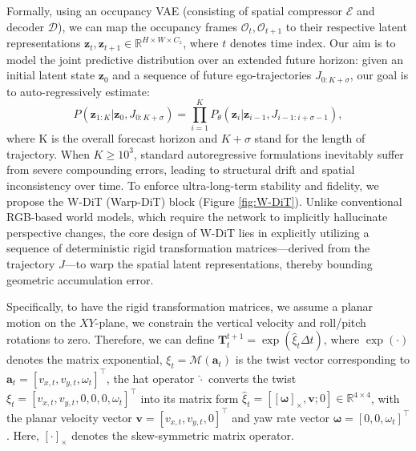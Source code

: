 Formally, using an occupancy VAE  \cite{liu2025towards} (consisting of spatial compressor $\mathcal{E}$ and decoder $\mathcal{D}$), we can map the occupancy frames $\mathcal{O}_t, \mathcal{O}_{t+1}$ to their respective latent representations $\mathbf{z}_t, \mathbf{z}_{t+1} \in \mathbb{R}^{H \times W \times C_z}$, where $t$ denotes time index. Our aim is to model the joint predictive distribution over an extended future horizon: given an initial latent state $\mathbf{z}_0$ and a sequence of future ego-trajectories $J_{0:K+\sigma}$, our goal is to auto-regressively estimate:
\vspace{-2mm}
\begin{equation}
    P(\mathbf{z}_{1:K} | \mathbf{z}_0, J_{0:K+\sigma}) = \prod_{i=1}^{K} P_{\theta}(\mathbf{z}_{i} | \mathbf{z}_{i-1}, J_{i-1:i+\sigma-1}),
\end{equation}%
where K is the overall forecast horizon and $K + \sigma$ stand for the length of trajectory. When $K \geq 10^{3}$, standard autoregressive formulations inevitably suffer from severe compounding errors, leading to structural drift and spatial inconsistency over time. To enforce ultra-long-term stability and fidelity, we propose the W-DiT (Warp-DiT) block (Figure \ref{fig:W-DiT}). Unlike conventional RGB-based world models, which require the network to implicitly hallucinate perspective changes, the core design of W-DiT lies in explicitly utilizing a sequence of deterministic rigid transformation matrices—derived from the trajectory $J$—to warp the spatial latent representations, thereby bounding geometric accumulation error.
 

Specifically, to have the rigid transformation matrices, we assume a planar motion on the $XY$-plane, we constrain the vertical velocity and roll/pitch rotations to zero. Therefore, we can define $\mathbf{T}_{t}^{t+1} = \exp(\widehat{\xi}_t \Delta t)$, where $\exp(\cdot)$ denotes the matrix exponential, $\xi_t = \mathcal{M}(\boldsymbol{a}_t)$ is the twist vector corresponding to $\boldsymbol{a}_t = [v_{x,t}, v_{y,t}, \omega_t]^\top$, the hat operator $\widehat{\cdot}$ converts the twist $\xi_t = [v_{x,t}, v_{y,t}, 0, 0, 0, \omega_t]^\top$ into its matrix form $\widehat{\xi}_t = [ [\boldsymbol{\omega}]_\times, \mathbf{v}; 0 ] \in \mathbb{R}^{4\times4}$, with the planar velocity vector $\mathbf{v} = [v_{x,t}, v_{y,t}, 0]^\top$ and yaw rate vector $\boldsymbol{\omega} = [0, 0, \omega_t]^\top$. Here, $[\cdot]_\times$ denotes the skew-symmetric matrix operator.

